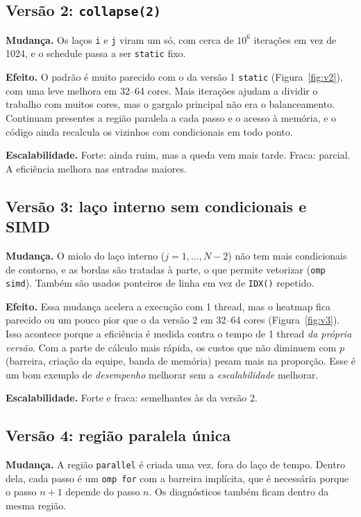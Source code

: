 \documentclass[a4paper,12pt]{article}
\begin{document}
\subsection{Versão 2: \texttt{collapse(2)}}

\textbf{Mudança.} Os laços \texttt{i} e \texttt{j} viram um só, com cerca de
$10^6$ iterações em vez de 1024, e o schedule passa a ser \texttt{static} fixo.

\textbf{Efeito.} O padrão é muito parecido com o da versão 1 \texttt{static}
(Figura~\ref{fig:v2}), com uma leve melhora em 32--64 cores. Mais iterações
ajudam a dividir o trabalho com muitos cores, mas o gargalo principal não era
o balanceamento. Continuam presentes a região paralela a cada passo e o
acesso à memória, e o código ainda recalcula os vizinhos com condicionais em
todo ponto.

\textbf{Escalabilidade.} Forte: ainda ruim, mas a queda vem mais tarde.
Fraca: parcial. A eficiência melhora nas entradas maiores.

\subsection{Versão 3: laço interno sem condicionais e SIMD}

\textbf{Mudança.} O miolo do laço interno ($j = 1, \dots, N-2$) não tem mais
condicionais de contorno, e as bordas são tratadas à parte, o que permite
vetorizar (\texttt{omp simd}). Também são usados ponteiros de linha em vez de
\texttt{IDX()} repetido.

\textbf{Efeito.} Essa mudança acelera a execução com 1 thread, mas o heatmap
fica parecido ou um pouco pior que o da versão 2 em 32--64 cores
(Figura~\ref{fig:v3}). Isso acontece porque a eficiência é medida contra o
tempo de 1 thread \emph{da própria versão}. Com a parte de cálculo mais rápida, os
custos que não diminuem com $p$ (barreira, criação da equipe, banda de
memória) pesam mais na proporção. Esse é um bom exemplo de
\emph{desempenho} melhorar sem a \emph{escalabilidade} melhorar.

\textbf{Escalabilidade.} Forte e fraca: semelhantes às da versão 2.

\subsection{Versão 4: região paralela única}

\textbf{Mudança.} A região \texttt{parallel} é criada uma vez, fora do laço de
tempo. Dentro dela, cada passo é um \texttt{omp for} com a barreira implícita,
que é necessária porque o passo $n+1$ depende do passo $n$. Os diagnósticos
também ficam dentro da mesma região.
\end{document}

